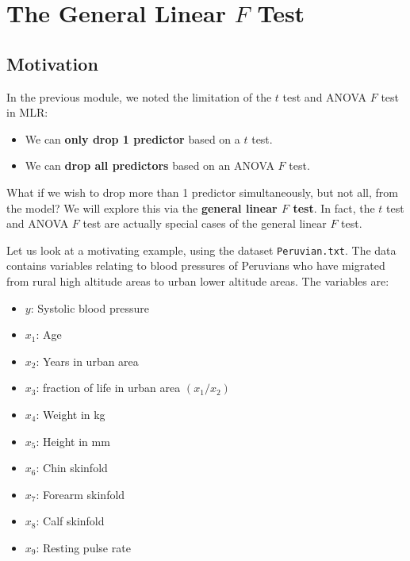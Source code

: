 \documentclass[
]{book}
\providecommand{\tightlist}{%
  \setlength{\itemsep}{0pt}\setlength{\parskip}{0pt}}
\begin{document}
\hypertarget{the-general-linear-f-test}{%
\section{\texorpdfstring{The General Linear \(F\) Test}{The General Linear F Test}}\label{the-general-linear-f-test}}

\hypertarget{motivation-1}{%
\subsection{Motivation}\label{motivation-1}}

In the previous module, we noted the limitation of the \(t\) test and ANOVA \(F\) test in MLR:

\begin{itemize}
\tightlist
\item
  We can \textbf{only drop 1 predictor} based on a \(t\) test.
\item
  We can \textbf{drop all predictors} based on an ANOVA \(F\) test.
\end{itemize}

What if we wish to drop more than 1 predictor simultaneously, but not all, from the model? We will explore this via the \textbf{general linear \(F\) test}. In fact, the \(t\) test and ANOVA \(F\) test are actually special cases of the general linear \(F\) test.

Let us look at a motivating example, using the dataset \texttt{Peruvian.txt}. The data contains variables relating to blood pressures of Peruvians who have migrated from rural high altitude areas to urban lower altitude areas. The variables are:

\begin{itemize}
\tightlist
\item
  \(y\): Systolic blood pressure
\item
  \(x_1\): Age
\item
  \(x_2\): Years in urban area
\item
  \(x_3\): fraction of life in urban area \((x_1/x_2)\)
\item
  \(x_4\): Weight in kg
\item
  \(x_5\): Height in mm
\item
  \(x_6\): Chin skinfold
\item
  \(x_7\): Forearm skinfold
\item
  \(x_8\): Calf skinfold
\item
  \(x_9\): Resting pulse rate
\end{itemize}
\end{document}
